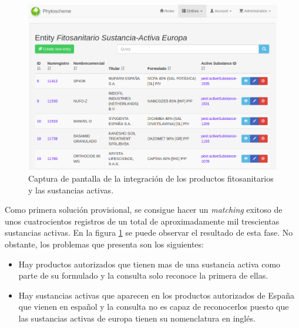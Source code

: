 \begin{figure}[!h]
    \centering
    \includegraphics[width=\textwidth,height=\textheight,keepaspectratio]{Imagenes/capturaFitSustAct}
    \caption{Captura de pantalla de la integración de  los productos fitosanitarios y las sustancias activas.}
    \label{fig:capturaFitSustAct}
\end{figure}

\par Como primera solución provisional, se consigue hacer un \textit{matching} exitoso de unos cuatrocientos registros de un total de aproximadamente mil trescientas sustancias activas. En la figura \ref{fig:capturaFitSustAct} se puede observar el resultado de esta fase. No obstante, los problemas que presenta son los siguientes: 


\begin{itemize}
\item Hay productos autorizados que tienen mas de una sustancia activa como parte de su formulado y la consulta solo reconoce la primera de ellas.
\item Hay sustancias activas que aparecen en los productos autorizados de España que vienen en español y la consulta no es capaz de reconocerlos puesto que las sustancias activas de europa tienen su nomenclatura en inglés.
\end{itemize}


\bigskip

